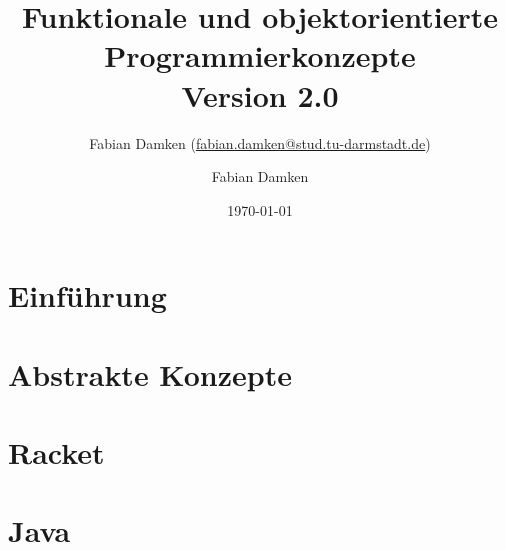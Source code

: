 \documentclass[
	a4paper, 
	11pt, 
	class=report, 
	T1, 
	accentcolor = TUDa-3b,
	marginpar=false,
]{tudapub}
\title{Funktionale und objektorientierte Programmierkonzepte \\ Version 2.0}
\subtitle{Fabian Damken (\href{mailto:fabian.damken@stud.tu-darmstadt.de?subject=[FoP-Skript]}{fabian.damken@stud.tu-darmstadt.de})}
\author{Fabian Damken}
\date{\today}
\begin{document}
	

    \maketitle
    \tableofcontents
    \listoftodos

    \chapter{Einführung}
	    \label{c:einfuehrung}
    
        

	\chapter{Abstrakte Konzepte}
		\label{c:abstrakte_konzepte}
	
		

    \chapter{Racket}
	    \label{c:racket}
    
        

    \chapter{Java}
	    \label{c:java}
    
        
    
    

    
    
\end{document}
